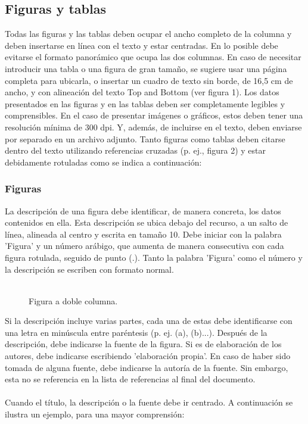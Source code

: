 \documentclass[10pt,letterpaper,twoside,twocolumn]{article}   %
\begin{document}
\subsection{Figuras y tablas}
Todas las figuras y las tablas deben ocupar el ancho completo de la columna y deben insertarse en línea con el texto y estar centradas. En lo posible debe evitarse el formato panorámico que ocupa las dos columnas. En caso de necesitar introducir una tabla o una figura de gran tamaño, se sugiere usar una página completa para ubicarla, o insertar un cuadro de texto sin borde, de 16,5 cm de ancho, y con alineación del texto Top and Bottom (ver figura 1). Los datos presentados en las figuras y en las tablas deben ser completamente legibles y comprensibles. En el caso de presentar imágenes o gráficos, estos deben tener una resolución mínima de 300 dpi. Y, además, de incluirse en el texto, deben enviarse por separado en un archivo adjunto. Tanto figuras como tablas deben citarse dentro del texto utilizando referencias cruzadas (p. ej., figura 2) y estar debidamente rotuladas como se indica a continuación:


\subsubsection{Figuras}
La descripción de una figura debe identificar, de manera concreta, los datos contenidos en ella. Esta descripción se ubica debajo del recurso, a un salto de línea, alineada al centro y escrita en tamaño 10. Debe iniciar con la palabra 'Figura' y un número arábigo, que aumenta de manera consecutiva con cada figura rotulada, seguido de punto (.). Tanto la palabra 'Figura' como el número y la descripción se escriben con formato normal. \\
\\

\begin{figure*}
  \centering
  \caption{Figura a doble columna.}
\end{figure*}


Si la descripción incluye varias partes, cada una de estas debe identificarse con una letra en minúscula entre paréntesis (p. ej. (a), (b)...). Después de la descripción, debe indicarse la fuente de la figura. Si es de elaboración de los autores, debe indicarse escribiendo 'elaboración propia'. En caso de haber sido tomada de alguna fuente, debe indicarse la autoría de la fuente. Sin embargo, esta no se referencia en la lista de referencias al final del documento.\\
\\
Cuando el título, la descripción o la fuente debe ir centrado. A continuación se ilustra un ejemplo, para una mayor comprensión:
\end{document}

